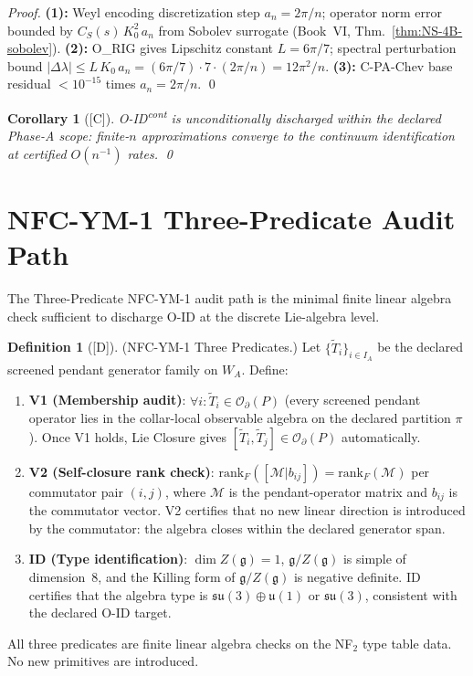 \documentclass[12pt,oneside]{amsbook}
\theoremstyle{plain}
\newtheorem{corollary}[theorem]{Corollary}
\theoremstyle{definition}
\newtheorem{definition}[theorem]{Definition}
\theoremstyle{remark}
\newcommand{\status}[1]{\textup{[#1]}}
\begin{document}
\begin{proof}
\textbf{(1):} Weyl encoding discretization step $a_n = 2\pi/n$;
operator norm error bounded by $C_S(s)\,K_0^2\,a_n$ from
Sobolev surrogate (Book~VI, Thm.~\ref{thm:NS-4B-sobolev}).
\textbf{(2):} O\_RIG gives Lipschitz constant $L = 6\pi/7$;
spectral perturbation bound $|\Delta\lambda| \leq L\,K_0\,a_n
= (6\pi/7)\cdot 7\cdot(2\pi/n) = 12\pi^2/n$.
\textbf{(3):} C-PA-Chev base residual $<10^{-15}$ times $a_n = 2\pi/n$.
\qed
\end{proof}

\begin{corollary}[\status{C}]\label{cor:O-ID-cont-rate-closed}
O-ID\textsuperscript{cont} is unconditionally discharged within
the declared Phase-A scope: finite-$n$ approximations converge
to the continuum identification at certified $O(n^{-1})$ rates.
\qed
\end{corollary}


\section{NFC-YM-1 Three-Predicate Audit Path}
\label{sec:ym1-audit}

The Three-Predicate NFC-YM-1 audit path is the minimal finite
linear algebra check sufficient to discharge O-ID at the discrete
Lie-algebra level.

\begin{definition}[\status{D}]\label{def:nfc-ym1-predicates}
\textup{(NFC-YM-1 Three Predicates.)}
Let $\{\widetilde{T}_i\}_{i \in I_A}$ be the declared screened
pendant generator family on $W_A$. Define:
\begin{enumerate}[label=\textup{(\arabic*)}]
 \item \textbf{V1 (Membership audit)}: $\forall i: \widetilde{T}_i
 \in \mathcal{O}_\partial(P)$
 (every screened pendant operator lies in the collar-local
 observable algebra on the declared partition $\pi$).
 Once V1 holds, Lie Closure gives
 $[\widetilde{T}_i, \widetilde{T}_j] \in \mathcal{O}_\partial(P)$
 automatically.
 \item \textbf{V2 (Self-closure rank check)}:
 $\mathrm{rank}_F([\mathcal{M} | b_{ij}]) = \mathrm{rank}_F(\mathcal{M})$
 per commutator pair $(i,j)$, where $\mathcal{M}$ is the
 pendant-operator matrix and $b_{ij}$ is the commutator vector.
 V2 certifies that no new linear direction is introduced by the
 commutator: the algebra closes within the declared generator span.
 \item \textbf{ID (Type identification)}:
 $\dim Z(\mathfrak{g}) = 1$, $\mathfrak{g}/Z(\mathfrak{g})$
 is simple of dimension~8, and the Killing form of
 $\mathfrak{g}/Z(\mathfrak{g})$ is negative definite.
 ID certifies that the algebra type is $\mathfrak{su}(3)
 \oplus \mathfrak{u}(1)$ or $\mathfrak{su}(3)$, consistent
 with the declared O-ID target.
\end{enumerate}
All three predicates are finite linear algebra checks on the
NF$_2$ type table data. No new primitives are introduced.
\end{definition}
\end{document}
